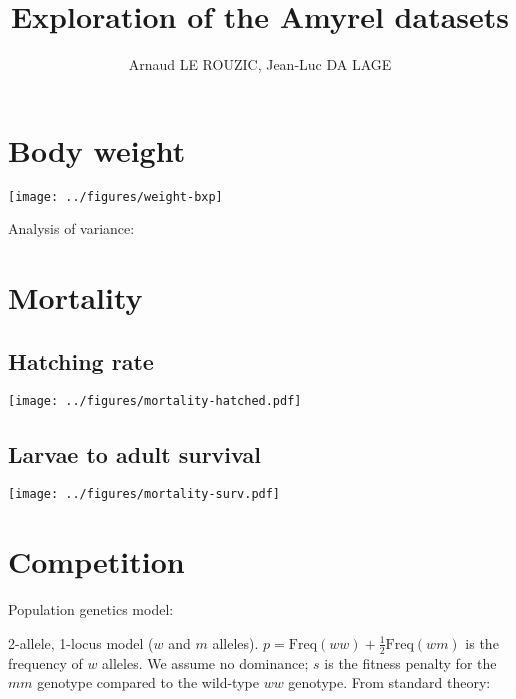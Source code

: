 \documentclass[10pt]{article}
\title{Exploration of the Amyrel datasets}
\author{Arnaud LE ROUZIC, Jean-Luc DA LAGE}
\begin{document}
\maketitle

\section{Body weight}

\begin{center}
    \texttt{[image: ../figures/weight-bxp]}
\end{center}

Analysis of variance:



\section{Mortality}

\subsection{Hatching rate}

\begin{center}
    \texttt{[image: ../figures/mortality-hatched.pdf]}
\end{center}



\subsection{Larvae to adult survival}

\begin{center}
    \texttt{[image: ../figures/mortality-surv.pdf]}
\end{center}



\section{Competition}

Population genetics model: 

2-allele, 1-locus model ($w$ and $m$ alleles). $p = \mathrm{Freq}(ww) + \frac{1}{2}\mathrm{Freq}(wm)$ is the frequency of $w$ alleles. We assume no dominance; $s$ is the fitness penalty for the $mm$ genotype compared to the wild-type $ww$ genotype. From standard theory: 
\end{document}

